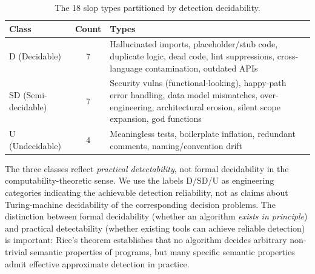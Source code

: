 \documentclass[11pt, a4paper]{googledeepmind}
\begin{document}
\begin{table}[htbp]
\centering
\caption{The 18 slop types partitioned by detection decidability.}
\label{tab:slop-partition}
\small
\begin{tabularx}{\textwidth}{l c X}
\toprule
\textbf{Class} & \textbf{Count} & \textbf{Types} \\
\midrule
D (Decidable) & 7 & Hallucinated imports, placeholder/stub code, duplicate logic, dead code, lint suppressions, cross-language contamination, outdated APIs \\
\addlinespace
SD (Semi-decidable) & 7 & Security vulns (functional-looking), happy-path error handling, data model mismatches, over-engineering, architectural erosion, silent scope expansion, god functions \\
\addlinespace
U (Undecidable) & 4 & Meaningless tests, boilerplate inflation, redundant comments, naming/convention drift \\
\bottomrule
\end{tabularx}
\end{table}

The three classes reflect \emph{practical detectability}, not formal decidability in the computability-theoretic sense. We use the labels D/SD/U as engineering categories indicating the achievable detection reliability, not as claims about Turing-machine decidability of the corresponding decision problems. The distinction between formal decidability (whether an algorithm \emph{exists in principle}) and practical detectability (whether existing tools can achieve reliable detection) is important: Rice's theorem establishes that no algorithm decides arbitrary non-trivial semantic properties of programs, but many specific semantic properties admit effective approximate detection in practice.
\end{document}
